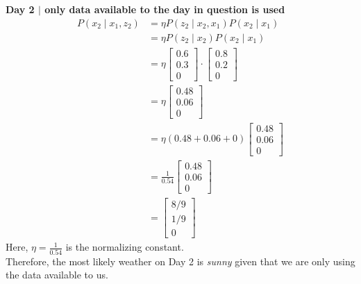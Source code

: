 \documentclass[answers]{exam}
\begin{document}
\begin{questions}
\begin{parts}
        \begin{solution}
            \textbf{Day 2 $\mid$ only data available to the day in question is used}
            \begin{align*}
                P(x_2 \mid x_1, z_2) &= \eta P(z_2 \mid x_2, x_1) P(x_2 \mid x_1) \\
                &= \eta P(z_2 \mid x_2) P(x_2 \mid x_1) \\
                &= \eta \begin{bmatrix}
                    0.6 \\
                    0.3 \\
                    0 
                \end{bmatrix} \cdot \begin{bmatrix}
                    0.8 \\
                    0.2 \\
                    0
                \end{bmatrix} \\
                &= \eta \begin{bmatrix}
                    0.48 \\
                    0.06 \\
                    0
                \end{bmatrix} \\
                &= \eta \left( 0.48 + 0.06 + 0 \right) \begin{bmatrix}
                    0.48 \\
                    0.06 \\
                    0
                \end{bmatrix} \\
                &= \frac{1}{0.54} \begin{bmatrix}
                    0.48 \\
                    0.06 \\
                    0
                \end{bmatrix} \\
                &= \begin{bmatrix}
                    8/9 \\
                    1/9 \\
                    0
                \end{bmatrix}
            \end{align*}
            Here, \(\eta = \frac{1}{0.54}\) is the normalizing constant. \\
            Therefore, the most likely weather on Day 2 is \textit{sunny} given that we are only using the data available to us.
            

\end{solution}
\end{parts}
\end{questions}
\end{document}
